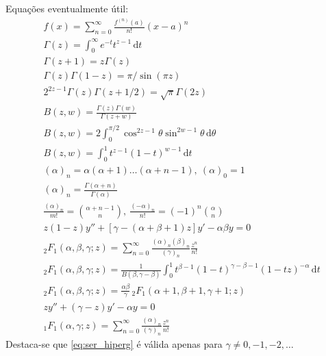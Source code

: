 \documentclass[a4paper,12pt, leqno, answers]{exam}
\begin{document}
\thispagestyle{empty}

\newpage
\setcounter{page}{1}
Equa\c{c}\~{o}es eventualmente útil:
\begin{align}
    & f(x) = \sum_{n = 0}^\infty \frac{f^{(n)}(a)}{n!} (x - a)^n \tag{ST} \label{eq:ser_taylor} \\
    & \Gamma(z) = \int_0^\infty e^{-t} t^{z - 1} \,\mathrm{d}t \tag{GE} \label{eq:gamma_euler} \\
    & \Gamma(z + 1) = z \Gamma(z) \label{eq:gamma_rel} \\
    & \Gamma(z) \Gamma(1 - z) = \pi / \sin(\pi z) \label{eq:gamma_sin} \\
    & 2^{2 z - 1} \Gamma(z) \Gamma(z + 1/2) = \sqrt{\pi} \Gamma(2 z) \label{eq:gamma_dup_legendre} \\
    & B(z, w) = \frac{\Gamma(z) \Gamma(w)}{\Gamma(z + w)} \tag{BG} \label{eq:beta} \\
    & B(z, w) = 2 \int_0^{\pi / 2} \cos^{2z - 1} \theta \sin^{2w - 1} \theta \,\mathrm{d}\theta \tag{BT} \label{eq:beta_trig} \\
    & B(z, w) = \int_0^1 t^{z - 1} (1 - t)^{w - 1} \,\mathrm{d}t \tag{BI} \label{eq:beta_int} \\
    & (\alpha)_n = \alpha (\alpha + 1) \ldots (\alpha + n - 1), \ (\alpha)_0 = 1 \tag{SP} \label{eq:sim_poch} \\
    & (\alpha)_n = \frac{\Gamma(\alpha + n)}{\Gamma(\alpha)} \label{eq:sim_poch_gamma} \\
    & \frac{(\alpha)_n}{m!} = \binom{\alpha + n - 1}{n}, \ \frac{(-\alpha)_n}{n!} = (-1)^n \binom{\alpha}{n} \label{eq:sim_poch_binom} \\
    & z(1 - z)y'' + \left[ \gamma - (\alpha + \beta + 1) z \right] y' - \alpha \beta y = 0 \tag{EH} \label{eq:hiperg} \\
    & {}_2F_1(\alpha, \beta, \gamma; z) = \sum_{n = 0}^\infty \frac{(\alpha)_n (\beta)_n}{(\gamma)_n} \frac{z^n}{n!} \tag{SH} \label{eq:ser_hiperg} \\
    & {}_2F_1(\alpha, \beta, \gamma; z) = \frac{1}{B(\beta, \gamma - \beta)} \int_0^1 t^{\beta - 1} (1- t)^{\gamma - \beta - 1} (1 - tz)^{-\alpha} \,\mathrm{d}t \label{eq:hiperg_int} \\
    & {}_2F_1(\alpha, \beta, \gamma; z) = \frac{\alpha \beta}{\gamma} \,{}_2F_1(\alpha + 1, \beta + 1, \gamma + 1; z) \label{eq:hiperg_der} \\
    & zy'' + (\gamma - z)y' - \alpha y = 0 \tag{EHC} \label{eq:hiper_con} \\
    & {}_1F_1(\alpha, \gamma; z) = \sum_{n = 0}^\infty \frac{(\alpha)_n}{(\gamma)_n} \frac{z^n}{n!} \tag{SHC} \label{eq:ser_hiperg_con}
\end{align}
Destaca-se que \eqref{eq:ser_hiperg} \'{e} v\'{a}lida apenas para $\gamma \neq 0, -1, -2, \ldots$
\end{document}
